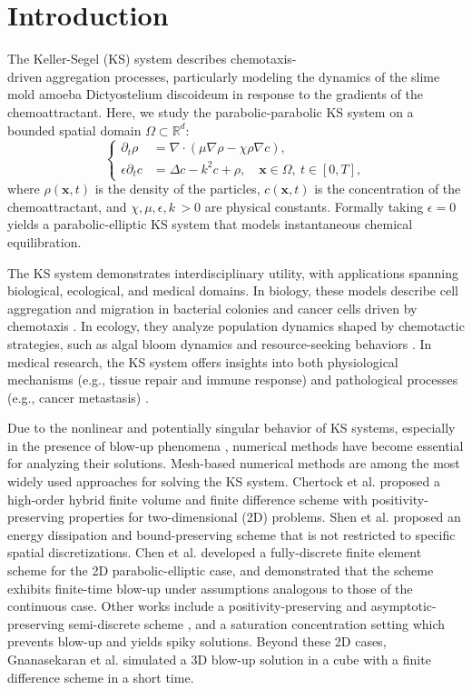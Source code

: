 \documentclass[review,onefignum,onetabnum]{siamart250211}
\begin{document}
\section{Introduction}
The Keller-Segel (KS) system \cite{KS} describes chemotaxis-\\driven aggregation processes, particularly modeling the dynamics of the slime mold amoeba Dictyostelium discoideum in response to the gradients of the chemoattractant. Here, we study the parabolic-parabolic KS system on a bounded spatial domain $\Omega \subset \mathbb{R}^d$:
\begin{equation}
\left\{
\begin{aligned}
\partial_t \rho &= \nabla \cdot \left( \mu \nabla\rho - \chi \rho \nabla c \right), \\
\epsilon \partial_t c &= \Delta c - k^2 c + \rho, \quad \mathbf{x} \in \Omega,\ t \in [0,T],
\end{aligned}
\right.
\label{eq:para_system}
\end{equation}
where $\rho(\mathbf{x},t)$ is the density of the particles, $c(\mathbf{x},t)$ is the concentration of the chemoattractant, and $\chi, \mu, \epsilon, k\,>0$ are physical constants. Formally taking $\epsilon = 0$ yields a parabolic-elliptic KS system that models instantaneous chemical equilibration.

The KS system demonstrates interdisciplinary utility, with applications spanning biological, ecological, and medical domains. In biology, these models describe cell aggregation and migration in bacterial colonies and cancer cells driven by chemotaxis \cite{Transport}. In ecology, they analyze population dynamics shaped by chemotactic strategies, such as algal bloom dynamics and resource-seeking behaviors \cite{crossref2}. In medical research, the KS system offers insights into both physiological mechanisms (e.g., tissue repair and immune response) and pathological processes (e.g., cancer metastasis) \cite{crossref3}.

Due to the nonlinear and potentially singular behavior of KS systems, especially in the presence of blow-up phenomena \cite{nagai1995blow, herrero1998self}, numerical methods have become essential for analyzing their solutions. Mesh-based numerical methods are among the most widely used approaches for solving the KS system. Chertock et al. \cite{pos_preserving} proposed a high-order hybrid finite volume and finite difference scheme with positivity-preserving properties for two-dimensional (2D) problems. Shen et al. \cite{shen2020unconditionally} proposed an energy dissipation and bound-preserving scheme that is not restricted to specific spatial discretizations. Chen et al. \cite{chen2022error} developed a fully-discrete finite element scheme for the 2D parabolic-elliptic case, and demonstrated that the scheme exhibits finite-time blow-up under assumptions analogous to those of the continuous case. Other works include a positivity-preserving and asymptotic-preserving semi-discrete scheme \cite{LiuJian-Guo2018Paap}, and a saturation concentration setting \cite{hillen2001global} which prevents blow-up and yields spiky solutions. Beyond these 2D cases, Gnanasekaran et al. \cite{3Dblowup} simulated a 3D blow-up solution in a cube with a finite difference scheme in a short time.
 
\end{document}
